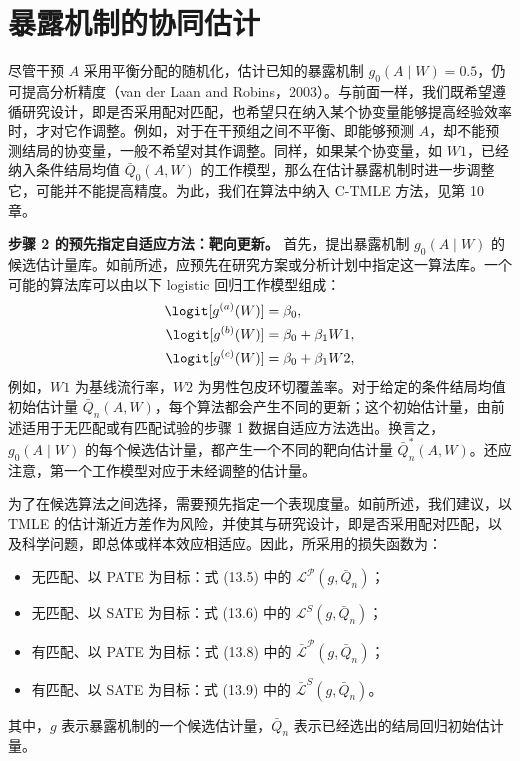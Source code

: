 \section{暴露机制的协同估计}
\label{sec:ch13-collaborative-exposure}

尽管干预 $A$ 采用平衡分配的随机化，估计已知的暴露机制 $g_0(A\mid W)=0.5$，仍可提高分析精度（van der Laan and Robins，2003）。与前面一样，我们既希望遵循研究设计，即是否采用配对匹配，也希望只在纳入某个协变量能够提高经验效率时，才对它作调整。例如，对于在干预组之间不平衡、即能够预测 $A$，却不能预测结局的协变量，一般不希望对其作调整。同样，如果某个协变量，如 $W1$，已经纳入条件结局均值 $\bar Q_0(A,W)$ 的工作模型，那么在估计暴露机制时进一步调整它，可能并不能提高精度。为此，我们在算法中纳入 C-TMLE 方法，见第 10 章。

\noindent\textbf{步骤 2 的预先指定自适应方法：靶向更新。}
首先，提出暴露机制 $g_0(A\mid W)$ 的候选估计量库。如前所述，应预先在研究方案或分析计划中指定这一算法库。一个可能的算法库可以由以下 logistic 回归工作模型组成：
\[
 \begin{aligned}
 \logit[g^{(a)}(W)]&=\beta_0,\\
 \logit[g^{(b)}(W)]&=\beta_0+\beta_1W1,\\
 \logit[g^{(c)}(W)]&=\beta_0+\beta_1W2,
 \end{aligned}
\]
例如，$W1$ 为基线流行率，$W2$ 为男性包皮环切覆盖率。对于给定的条件结局均值初始估计量 $\bar Q_n(A,W)$，每个算法都会产生不同的更新；这个初始估计量，由前述适用于无匹配或有匹配试验的步骤 1 数据自适应方法选出。换言之，$g_0(A\mid W)$ 的每个候选估计量，都产生一个不同的靶向估计量 $\bar Q_n^*(A,W)$。还应注意，第一个工作模型对应于未经调整的估计量。

为了在候选算法之间选择，需要预先指定一个表现度量。如前所述，我们建议，以 TMLE 的估计渐近方差作为风险，并使其与研究设计，即是否采用配对匹配，以及科学问题，即总体或样本效应相适应。因此，所采用的损失函数为：
\begin{itemize}
 \item 无匹配、以 PATE 为目标：式 (13.5) 中的 $\mathcal L^{\mathcal P}(g,\bar Q_n)$；
 \item 无匹配、以 SATE 为目标：式 (13.6) 中的 $\mathcal L^S(g,\bar Q_n)$；
 \item 有匹配、以 PATE 为目标：式 (13.8) 中的 $\bar{\mathcal L}^{\mathcal P}(g,\bar Q_n)$；
 \item 有匹配、以 SATE 为目标：式 (13.9) 中的 $\bar{\mathcal L}^S(g,\bar Q_n)$。
\end{itemize}
其中，$g$ 表示暴露机制的一个候选估计量，$\bar Q_n$ 表示已经选出的结局回归初始估计量。

